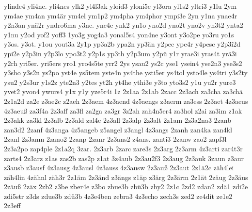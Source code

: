 {    ylinde4
    yli4ne.
    yli4nes
    ylk2
    yl4l3ak
    yloid3
    yloni5e
    yl3ora
    yl1s2
    yltri3
    y1lu
    2ym
    ym4ae
    ym4an
    ym4är
    ym4el
    ym1p2
    ym4pha
    ym4phor
    ympi3e
    2yn
    y1na
    ynae4r
    y2n3an
    ynä2r
    yndro6ma
    y3ne.
    yne4c
    ynk2
    yn1o
    yno2d
    yno2t
    yno2v
    yn3t2
    ynta2
    y1nu
    y2od
    yof2
    yoff3
    1yo3g
    yog4a3
    yonal5s4
    yon4ne
    y3ont
    y3o2pe
    yo3ru
    yo1s
    y3os.
    y3ot.
    y1ou
    yout3a
    2y1p
    yp3a2b
    ypa2n
    yp3än
    y2pec
    ype4r
    y4pesc
    y2p3i2d
    ypi2e
    y2p3in
    y2p3lo
    ypo3t2
    y2p1s
    yp3th
    y2p3um
    y2pü
    y1r
    yrae3i
    yras4t
    yrä3i
    y2rh
    yri5er.
    yri5ers
    yro1
    yro4s5te
    yrr2
    2ys
    ysau2
    ys2c
    yse1
    ysein4
    yse2n3
    yse3s2
    y3sho
    y3s2n
    ys2po
    yst4e
    ys5tem
    yste4n
    ys4the
    ysti5er
    ys4tol
    ysto4le
    ys4tri
    y3s2ty
    ysu2
    y2s3ur
    y1s2z
    yte2n3
    y2tes
    yt2h
    yt4he
    ythi3e
    y3to
    yto3s2
    y1u
    yu2r
    yure3
    yvet2
    yvon4
    ywurs4
    y1x
    y1y
    yze5r4i
    1z
    2z1aa
    2z1ab
    2zacc
    2z3ach
    za3cha
    za3chä
    2z1a2d
    za2e
    z3ae2c
    z2aeh
    2z3aem
    4z3aend
    4z5aengs
    z3aerm
    za3ess
    2z3aet
    4z3aeus
    4z3aeuß
    za3f4a
    2z3aff
    za3fl
    za2ga
    za3gr
    3z2ah
    zah4n5er4
    za3hol
    z2ai
    za3im
    z1ak
    2z3akk
    za3kl
    2z3alb
    2z3ald
    zal4e
    2z3all
    2z3alp
    2z3alt
    2z1am
    2z3a2na3
    2zanb
    zan3d2
    2zanf
    4z3anga
    4z5angeb
    z5angel
    z3angl
    4z3angs
    2zanh
    zan4ka
    zan4kl
    2zanl
    2z3anm
    2zano2
    2zanp
    2zanr
    2z3ans2
    z4ans.
    zanti3
    2zanw
    zao2
    zapf3l
    2z3a2po
    zap4ple
    2z1a2q
    3zar.
    2z3arb
    2zarc
    zare3s
    2z3arg
    2z3arm
    4z3arti
    zar4t3r
    zarts4
    2z3arz
    z1as
    zas2b
    zas2p
    z1at
    3z4aub
    2z3au2f3
    2z3aug
    2z3auk
    3zaun
    z3aur
    z3ausb
    z3ausf
    4z3ausg
    4z3ausl
    4z3auss
    4z3ausw
    2z3auß
    2z3aut
    2z1ä2c
    zäh4lei
    zäh4lin
    4zähnl
    zäh3r
    2z1äm
    2z3änd
    z3ängs
    z1äp
    z3ärg
    2z3ärm
    2z1ät
    2zäug
    2z3äus
    2zäuß
    2zäx
    2zb2
    z3be
    zber4e
    z3bo
    zbue3b
    zbü3b
    zby2
    2z1c
    2zd2
    zdan2
    zdä1
    zdi2e
    zdi5str
    z3ds
    zdue3b
    zdü3b
    4z3e4ben
    zebra3
    4z3echo
    zech3s
    zed2
    ze4dit
    ze1e2
    2z3eff
}
